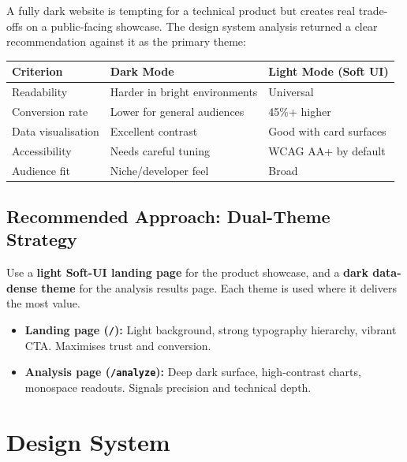 \documentclass[12pt,a4paper]{article}
\begin{document}
A fully dark website is tempting for a technical product but creates real trade-offs
on a public-facing showcase. The design system analysis returned a clear recommendation
against it as the primary theme:

\begin{center}
\begin{tabular}{p{3.2cm} p{4.5cm} p{4.5cm}}
\toprule
\textbf{Criterion} & \textbf{Dark Mode} & \textbf{Light Mode (Soft UI)} \\
\midrule
Readability & Harder in bright environments & Universal \\
Conversion rate & Lower for general audiences & 45\%+ higher \\
Data visualisation & Excellent contrast & Good with card surfaces \\
Accessibility & Needs careful tuning & WCAG AA+ by default \\
Audience fit & Niche/developer feel & Broad \\
\bottomrule
\end{tabular}
\end{center}

\subsection{Recommended Approach: Dual-Theme Strategy}

\begin{tcolorbox}[recbox, title={Design Decision}]
  Use a \textbf{light Soft-UI landing page} for the product showcase, and a
  \textbf{dark data-dense theme} for the analysis results page. Each theme is
  used where it delivers the most value.

  \begin{itemize}[leftmargin=1.2em]
    \item \textbf{Landing page (\texttt{/}):} Light background, strong typography
          hierarchy, vibrant CTA. Maximises trust and conversion.
    \item \textbf{Analysis page (\texttt{/analyze}):} Deep dark surface, high-contrast
          charts, monospace readouts. Signals precision and technical depth.
  \end{itemize}
\end{tcolorbox}

\section{Design System}
\end{document}
